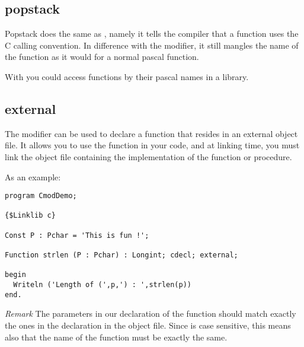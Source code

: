 \documentclass{report}
\begin{document}
\subsection{popstack}
\label{se:popstack}
Popstack does the same as , namely it tells the \fpc compiler
that a function uses the C calling convention. In difference with the
 modifier, it still mangles the name of the function as it would 
for a normal pascal function.

With  you could access functions by their pascal names in a
library.

\subsection{external}
\label{se:external}
The  modifier can be used to declare a function that resides in
an external object file. It allows you to use the function in
your code, and at linking time, you must link the object file containing the
implementation of the function or procedure.

As an example:
\begin{CodEx}
\begin{verbatim}
program CmodDemo;

{$Linklib c}

Const P : Pchar = 'This is fun !';

Function strlen (P : Pchar) : Longint; cdecl; external;

begin
  Writeln ('Length of (',p,') : ',strlen(p))
end.
\end{verbatim}
\end{CodEx}

{\em Remark} The parameters in our declaration of the  function 
should match exactly the ones in the declaration in the object file.
Since  is case sensitive, this means also that the name of the
function must be exactly the same.
\end{document}
